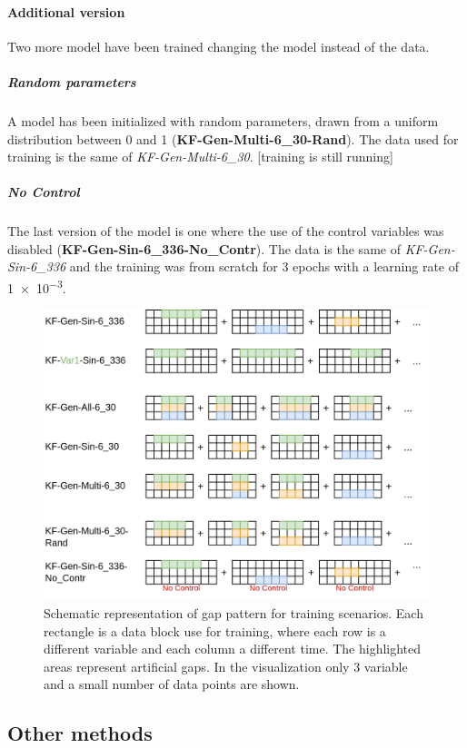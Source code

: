 \documentclass{article}
\let\Oldsubsection\subsection
\renewcommand{\subsection}{\FloatBarrier\Oldsubsection}
\begin{document}
\paragraph{Additional version} Two more model have been trained changing the model instead of the data.

\subparagraph{Random parameters} A model has been initialized with random parameters, drawn from a uniform distribution between 0 and 1 (\textbf{KF-Gen-Multi-6\_30-Rand}). The data used for training is the same of  \textit{KF-Gen-Multi-6\_30}. [training is still running]

\subparagraph{No Control} The last version of the model is one where the use of the control variables was disabled (\textbf{KF-Gen-Sin-6\_336-No\_Contr}). The data is the same of \textit{KF-Gen-Sin-6\_336} and the training was from scratch for \num{3} epochs with a learning rate of \num{1e-3}.

\begin{figure}
\centerline{\includegraphics[width=\textwidth]{training scenarios}}
\caption{Schematic representation of gap pattern for training scenarios. Each rectangle is a data block use for training, where each row is a different variable and each column a different time. The highlighted areas represent artificial gaps. In the visualization only 3 variable and a small number of data points are shown.}
\label{fig:training}
\end{figure}

\subsection{Other methods}
\end{document}
